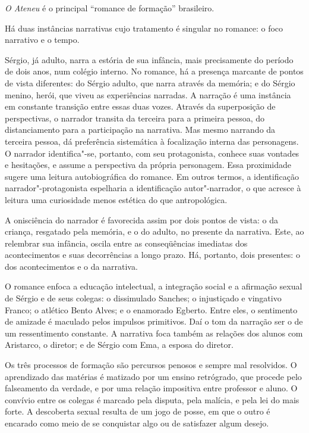 \textit{O Ateneu} é o principal ``romance de
formação'' brasileiro.

Há duas instâncias narrativas cujo tratamento é singular no romance: o
foco narrativo e o tempo.

Sérgio, já adulto, narra a estória de sua infância, mais precisamente do
período de dois anos, num colégio interno. No romance, há a presença
marcante de pontos de vista diferentes: do Sérgio adulto, que narra
através da memória; e do Sérgio menino, herói, que viveu as
experiências narradas. A narração é uma instância em constante
transição entre essas duas vozes. Através da superposição de
perspectivas, o narrador transita da terceira para a primeira pessoa,
do distanciamento para a participação na narrativa. Mas mesmo narrando
da terceira pessoa, dá preferência sistemática à focalização interna
das personagens. O narrador identifica"-se, portanto, com seu
protagonista, conhece suas vontades e hesitações, e assume a
perspectiva da própria personagem. Essa proximidade sugere uma leitura
autobiográfica do romance. Em outros termos, a identificação
narrador"-protagonista espelharia a identificação autor"-narrador, o
que acresce à leitura uma curiosidade menos estética do que antropológica. 

A onisciência do narrador é favorecida assim por dois pontos de vista: o
da criança, resgatado pela memória, e o do adulto, no presente da
narrativa. Este, ao relembrar sua infância, oscila entre as
conseqüências imediatas dos acontecimentos e suas decorrências a longo
prazo. Há, portanto, dois presentes: o dos acontecimentos e o da narrativa.

O romance enfoca a educação intelectual, a integração social e a
afirmação sexual de Sérgio e de seus colegas: o dissimulado Sanches; o
injustiçado e vingativo Franco; o atlético Bento
Alves; e o enamorado Egberto. Entre eles, o sentimento de amizade é
maculado pelos impulsos primitivos. Daí o tom da narração ser o de um
ressentimento constante. A narrativa foca também as relações dos alunos
com Aristarco, o diretor; e de Sérgio com Ema, a esposa do diretor.

Os três processos de formação são percursos penosos e sempre mal
resolvidos. O aprendizado das matérias é matizado por um ensino
retrógrado, que procede pelo falseamento da verdade, e por uma relação
impositiva entre professor e aluno. O convívio entre os colegas é
marcado pela disputa, pela malícia, e pela lei do mais forte. A
descoberta sexual resulta de um jogo de posse, em que o outro é
encarado como meio de se conquistar algo ou de satisfazer algum desejo.


